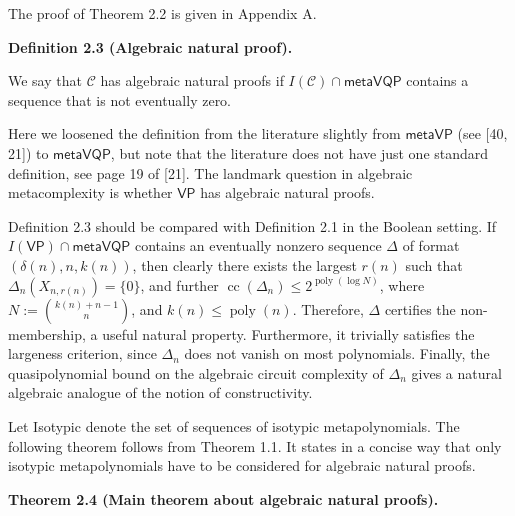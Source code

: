 \documentclass[10pt,a4paper]{article}
\begin{document}
The proof of Theorem 2.2 is given in Appendix A.





\par\medskip\noindent\textbf{Definition 2.3 (Algebraic natural proof).}\par



We say that $\mathcal{C}$ has algebraic natural proofs if $I(\mathcal{C})\mathop{\cap}\mathsf{metaVQP}$ contains a sequence that is not eventually zero.






Here we loosened the definition from the literature slightly from $\mathsf{metaVP}$ (see [40, 21]) to $\mathsf{metaVQP}$, but note that the literature does not have just one standard definition, see page 19 of [21].
The landmark question in algebraic metacomplexity is whether $\mathsf{VP}$ has algebraic natural proofs.





Definition 2.3 should be compared with Definition 2.1 in the Boolean setting. If $I(\mathsf{VP})\mathop{\cap}\mathsf{metaVQP}$ contains an eventually nonzero sequence $\Delta$ of format $(\delta(n),n,k(n))$, then clearly there exists the largest $r(n)$ such that $\Delta_{n}(X_{n,r(n)})=\{0\}$, and further $\operatorname{cc}(\Delta_{n})\leq 2^{\operatorname{poly}(\log N)}$, where $N:=\binom{k(n)+n-1}{n}$, and $k(n)\leq\operatorname{poly}(n)$. Therefore, $\Delta$ certifies the non-membership, a useful natural property. Furthermore, it trivially satisfies the largeness criterion, since $\Delta_{n}$ does not vanish on most polynomials. Finally, the quasipolynomial bound on the algebraic circuit complexity of $\Delta_{n}$ gives a natural algebraic analogue of the notion of constructivity.





Let Isotypic denote the set of sequences of isotypic metapolynomials.
The following theorem follows from Theorem 1.1. It states in a concise way that only isotypic metapolynomials have to be considered for algebraic natural proofs.





\par\medskip\noindent\textbf{Theorem 2.4 (Main theorem about algebraic natural proofs).}\par
\end{document}
